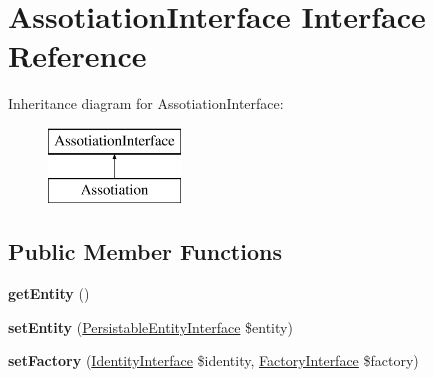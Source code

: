 \hypertarget{interface_pes_1_1_entity_1_1_persistable_1_1_assotiation_interface}{}\section{Assotiation\+Interface Interface Reference}
\label{interface_pes_1_1_entity_1_1_persistable_1_1_assotiation_interface}
Inheritance diagram for Assotiation\+Interface\+:\begin{figure}[H]
\begin{center}
\leavevmode
\includegraphics[height=2.000000cm]{interface_pes_1_1_entity_1_1_persistable_1_1_assotiation_interface}
\end{center}
\end{figure}
\subsection*{Public Member Functions}
\begin{DoxyCompactItemize}
\item 
\mbox{\label{interface_pes_1_1_entity_1_1_persistable_1_1_assotiation_interface_a0848c661e55b6027e3794d16cad5d501}} 
{\bfseries get\+Entity} ()
\item 
\mbox{\label{interface_pes_1_1_entity_1_1_persistable_1_1_assotiation_interface_acf40e0d478a8619df5c333c2149b043e}} 
{\bfseries set\+Entity} (\mbox{\hyperlink{interface_pes_1_1_entity_1_1_persistable_1_1_persistable_entity_interface}{Persistable\+Entity\+Interface}} \$entity)
\item 
\mbox{\label{interface_pes_1_1_entity_1_1_persistable_1_1_assotiation_interface_a3857b464b1fda4e7177ea6017c80ec26}} 
{\bfseries set\+Factory} (\mbox{\hyperlink{interface_pes_1_1_entity_1_1_persistable_1_1_identity_interface}{Identity\+Interface}} \$identity, \mbox{\hyperlink{interface_pes_1_1_entity_1_1_persistable_1_1_factory_1_1_factory_interface}{Factory\+Interface}} \$factory)
\end{DoxyCompactItemize}


